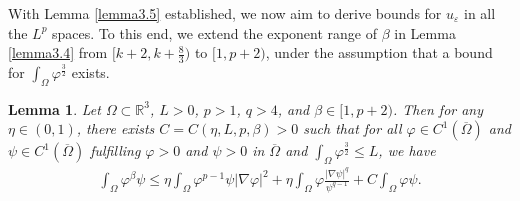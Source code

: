 \documentclass[12pt]{article}
\theoremstyle{plain}
\newtheorem{lemma}{Lemma}[section]
\theoremstyle{definition}
\numberwithin{equation}{section}
\begin{document}
With Lemma \ref{lemma3.5} established, we now aim to derive bounds for $u_\varepsilon$ in all the  $L^p$ spaces. To this end,
we extend the exponent range of $\beta$ in Lemma \ref{lemma3.4} from $[k+2, k+\frac 8 3)$ to $[1, p+2)$,
under the assumption that a bound for  $\int_{\Omega}\varphi^{\frac{3}{2}}$ exists.
\begin{lemma}\label{lemma3.6}
Let $\Omega\subset\mathbb{R}^3$, $L>0$, $p>1$, $q>4$, and $\beta\in [1,p+2)$. Then for any $\eta\in(0,1)$, there exists $C=C(\eta,L,p,\beta
 )>0$ such that for all  $\varphi\in C^1(\overline \Omega)$ and $\psi \in C^1(\overline \Omega)$ fulfilling $\varphi> 0$ and $\psi>0$ in $\overline \Omega$ and $\int_{\Omega}\varphi^{\frac{3}{2}}\leq L$, we have
  \begin{align}\label{3.16}
    \int_{\Omega}\varphi^{\beta} \psi\leq \eta \int_{\Omega}\varphi^{p-1}\psi|\nabla
    \varphi|^2+\eta \int_{\Omega}\varphi\frac{|\nabla  \psi|^q}{{\psi}^{q-1}}+C\int_{\Omega}\varphi \psi.
\end{align}
\end{lemma}
\end{document}
